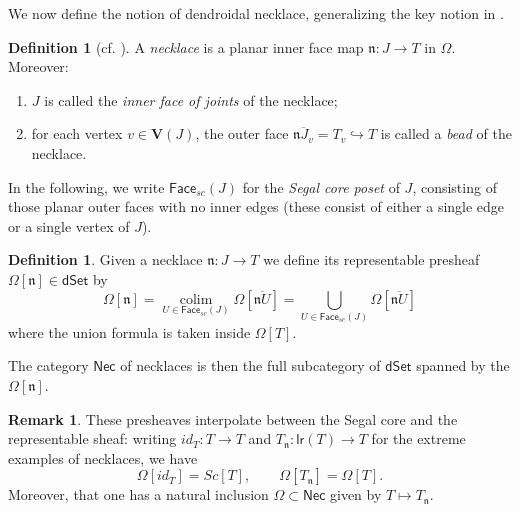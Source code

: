 \documentclass[a4paper,10pt
,draft
]{article}%
\numberwithin{equation}{section}
\numberwithin{figure}{section}
\theoremstyle{definition} %
\newtheorem{definition}[equation]{Definition}%
\newtheorem{remark}[equation]{Remark}%
\DeclareMathOperator{\colim}{colim}%
\newcommand{\1}{\ensuremath{\mathbbm 1}}%
\begin{document}
We now define the notion of dendroidal necklace,
generalizing the key notion in \cite{DS11}.
 

\begin{definition}[{cf. \cite[\S 3]{DS11}}]
	A \emph{necklace} is 
	a planar inner face map
	$\mathfrak{n} \colon J \to T$
	in $\Omega$.
	Moreover:
	\begin{enumerate}[label = (\roman*)]
		\item 
		$J$ is called the \emph{inner face of joints} of the necklace;
		\item for each vertex $v \in \boldsymbol{V}(J)$,
		the outer face
		$\overline{\mathfrak{n} J_v} = T_v \hookrightarrow T$
		is called a \emph{bead} of the necklace.
	\end{enumerate}
\end{definition}
  

In the following, we write 
$\mathsf{Face}_{sc}(J)$ for the \emph{Segal core poset} of $J$,
consisting of those planar outer faces with no inner edges
(these consist of either a single edge or a single vertex of $J$).



\begin{definition}
	Given a necklace $\mathfrak{n} \colon J \to T$ 
	we define its representable presheaf
	$\Omega[\mathfrak{n}] \in \mathsf{dSet}$ by
	\begin{equation}
	\Omega[\mathfrak{n}] 
	= 
	\underset{U \in \mathsf{Face}_{sc}(J)}{\colim}
	\Omega[\overline{\mathfrak{n} U}]
	=
	\bigcup_{U \in \mathsf{Face}_{sc}(J)} 
	\Omega[\overline{\mathfrak{n} U}]
	\end{equation}
	where the union formula is taken inside $\Omega[T]$.
	
	The category $\mathsf{Nec}$ of necklaces is then the full subcategory of $\mathsf{dSet}$
	spanned by the $\Omega[\mathfrak{n}]$.
\end{definition}

\begin{remark}
      These presheaves interpolate between the Segal core and the representable sheaf:
      writing $id_T \colon T \to T$ and $T_{\mathfrak n} \colon \mathsf{lr}(T) \to T$
      for the extreme examples of necklaces,
      we have
      \[
            \Omega[id_T] = Sc[T],
            \qquad
            \Omega[T_{\mathfrak n}] = \Omega[T].
      \]
      Moreover, 
      that one has a natural inclusion
      $\Omega \subset \mathsf{Nec}$
      given by $T \mapsto T_{\mathfrak{n}}$.
\end{remark}
\end{document}
